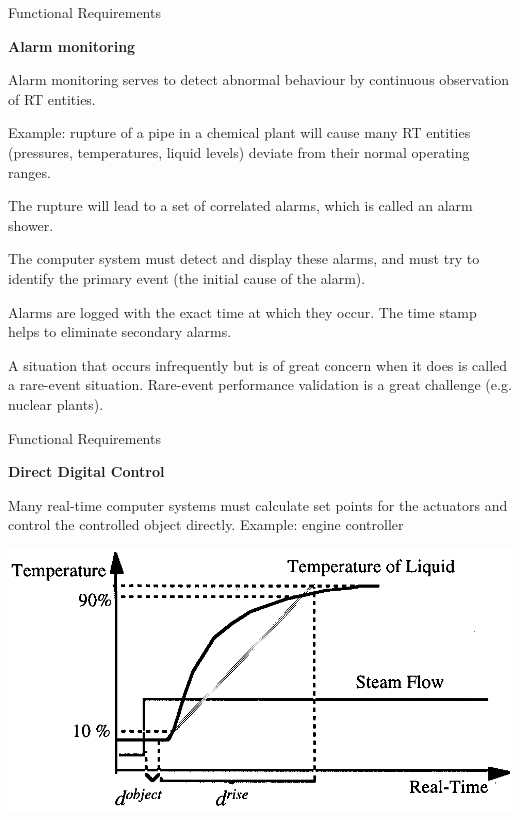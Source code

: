 \begin{frame}{Functional Requirements}

\textbf{Alarm monitoring}
\newline

Alarm monitoring serves to detect abnormal behaviour by continuous
observation of RT entities.
\newline

Example: rupture of a pipe in a chemical plant will cause many RT
entities (pressures, temperatures, liquid levels) deviate from their
normal operating ranges.

The rupture will lead to a set of correlated alarms, which is called an
alarm shower.

The computer system must detect and display these alarms, and must try
to identify the primary event (the initial cause of the alarm).
\newline

Alarms are logged with the exact time at which they occur. The time
stamp helps to eliminate secondary alarms.
\newline

A situation that occurs infrequently but is of great concern when it
does is called a rare-event situation. Rare-event performance validation
is a great challenge (e.g. nuclear plants).\\

\end{frame}

\begin{frame}{Functional Requirements}

\textbf{Direct Digital Control}

Many real-time computer systems must calculate set points for the
actuators and control the controlled object directly. Example: engine
controller

\includegraphics[width=\textwidth]{media/Fig_1_4.png}

\end{frame}

